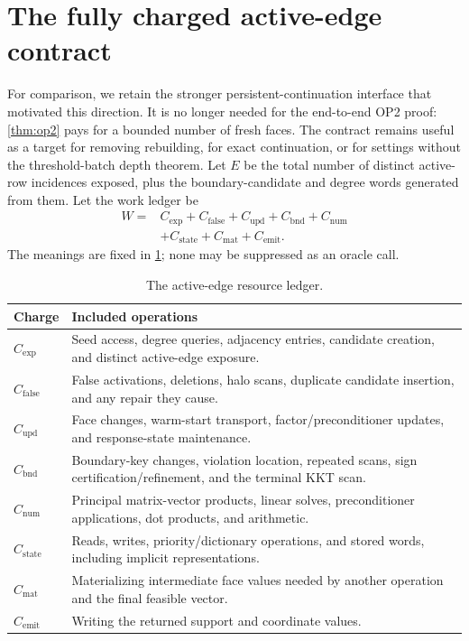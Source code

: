 \section{The fully charged active-edge contract}
\label{sec:contract}

For comparison, we retain the stronger persistent-continuation interface that
motivated this direction.  It is no longer needed for the end-to-end OP2 proof:
\cref{thm:op2} pays for a bounded number of fresh faces.  The contract remains
useful as a target for removing rebuilding, for exact continuation, or for
settings without the threshold-batch depth theorem.
Let $E$ be the total number of distinct active-row incidences exposed, plus
the boundary-candidate and degree words generated from them.  Let the work
ledger be
\begin{equation}
 \begin{split}
 W={}&C_{\mathrm{exp}}+C_{\mathrm{false}}+C_{\mathrm{upd}}+C_{\mathrm{bnd}}
      +C_{\mathrm{num}}\\
    &+C_{\mathrm{state}}+C_{\mathrm{mat}}+C_{\mathrm{emit}}.
 \end{split}
 \label{eq:resource-ledger}
\end{equation}
The meanings are fixed in \cref{tab:ledger}; none may be suppressed as an
oracle call.

\begin{table}[t]
\centering
\small
\begin{tabularx}{\textwidth}{@{}p{}X@{}}
\toprule
Charge & Included operations \\
\midrule
$C_{\mathrm{exp}}$ & Seed access, degree queries, adjacency entries, candidate
creation, and distinct active-edge exposure. \\
$C_{\mathrm{false}}$ & False activations, deletions, halo scans, duplicate
candidate insertion, and any repair they cause. \\
$C_{\mathrm{upd}}$ & Face changes, warm-start transport, factor/preconditioner
updates, and response-state maintenance. \\
$C_{\mathrm{bnd}}$ & Boundary-key changes, violation location, repeated scans,
sign certification/refinement, and the terminal KKT scan. \\
$C_{\mathrm{num}}$ & Principal matrix-vector products, linear solves,
preconditioner applications, dot products, and arithmetic. \\
$C_{\mathrm{state}}$ & Reads, writes, priority/dictionary operations, and stored
words, including implicit representations. \\
$C_{\mathrm{mat}}$ & Materializing intermediate face values needed by another
operation and the final feasible vector. \\
$C_{\mathrm{emit}}$ & Writing the returned support and coordinate values. \\
\bottomrule
\end{tabularx}
\caption{The active-edge resource ledger.}
\label{tab:ledger}
\end{table}

